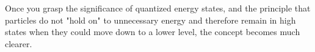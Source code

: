 Once you grasp the significance of quantized energy states, and the principle that particles do not "hold on" to unnecessary energy and therefore remain in high states when they could move down to a lower level, the concept becomes much clearer.





